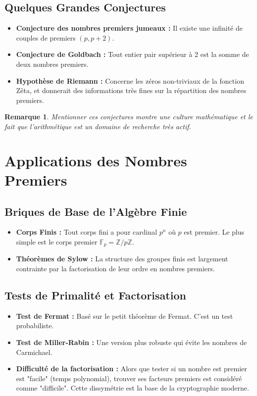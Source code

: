 \documentclass[12pt, a4paper, parskip=full]{report}
\theoremstyle{agregstyle}
\newtheorem{remark}[definition]{Remarque}
\begin{document}
\subsection{Quelques Grandes Conjectures}
\begin{itemize}
    \item \textbf{Conjecture des nombres premiers jumeaux :} Il existe une infinité de couples de premiers $(p, p+2)$.
    \item \textbf{Conjecture de Goldbach :} Tout entier pair supérieur à 2 est la somme de deux nombres premiers.
    \item \textbf{Hypothèse de Riemann :} Concerne les zéros non-triviaux de la fonction Zêta, et donnerait des informations très fines sur la répartition des nombres premiers.
\end{itemize}
\begin{remark}
    Mentionner ces conjectures montre une culture mathématique et le fait que l'arithmétique est un domaine de recherche très actif.
\end{remark}

\section{Applications des Nombres Premiers}

\subsection{Briques de Base de l'Algèbre Finie}
\begin{itemize}
    \item \textbf{Corps Finis :} Tout corps fini a pour cardinal $p^n$ où $p$ est premier. Le plus simple est le corps premier $\mathbb{F}_p = \mathbb{Z}/p\mathbb{Z}$.
    \item \textbf{Théorèmes de Sylow :} La structure des groupes finis est largement contrainte par la factorisation de leur ordre en nombres premiers.
\end{itemize}

\subsection{Tests de Primalité et Factorisation}
\begin{itemize}
    \item \textbf{Test de Fermat :} Basé sur le petit théorème de Fermat. C'est un test probabiliste.
    \item \textbf{Test de Miller-Rabin :} Une version plus robuste qui évite les nombres de Carmichael.
    \item \textbf{Difficulté de la factorisation :} Alors que tester si un nombre est premier est "facile" (temps polynomial), trouver ses facteurs premiers est considéré comme "difficile". Cette dissymétrie est la base de la cryptographie moderne.
\end{itemize}
\end{document}
